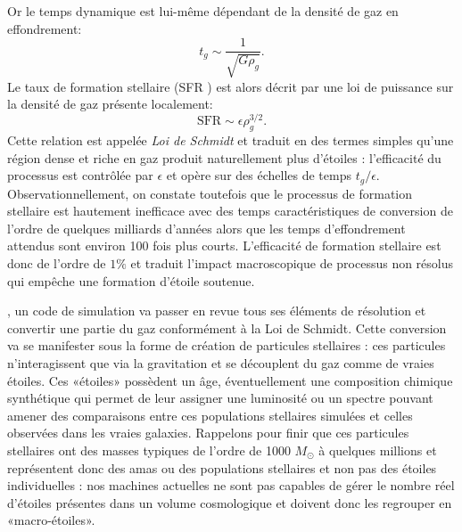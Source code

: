 Or le temps dynamique est lui-même dépendant de la densité de gaz en effondrement:
\begin{equation}
t_g\sim\frac{1}{\sqrt{G\rho_g}}.
\end{equation}
Le taux de formation stellaire (SFR ) est alors décrit par une loi de puissance sur la densité de gaz présente localement:
\begin{equation}
\mathrm{SFR}\sim \epsilon \rho_g^{3/2}.
\label{e:schmidt}
\end{equation}
Cette relation est appelée \textit{Loi de Schmidt} et traduit en des termes simples qu'une région dense et riche en gaz produit naturellement plus d'étoiles : l'efficacité du processus est contrôlée par $\epsilon$ et opère sur des échelles de temps $t_g/\epsilon$. Observationnellement, on constate toutefois que le processus de formation stellaire est hautement inefficace avec des temps caractéristiques de conversion de l'ordre de quelques milliards d'années alors que les temps d'effondrement attendus sont environ 100 fois plus courts. L'efficacité de formation stellaire est donc de l'ordre de $1\%$ et traduit l'impact macroscopique de processus non résolus qui empêche une formation d'étoile soutenue.

, un code de simulation va passer en revue tous ses éléments de résolution et convertir une partie du gaz conformément à la Loi de Schmidt. Cette conversion va se manifester sous la forme de création de particules stellaires : ces particules n'interagissent que via la gravitation et se découplent du gaz comme de vraies étoiles. Ces «étoiles» possèdent un âge, éventuellement une composition chimique synthétique qui permet de leur assigner une luminosité ou un spectre pouvant amener des comparaisons entre ces populations stellaires simulées et celles observées dans les vraies galaxies. Rappelons pour finir que ces particules stellaires ont des masses typiques de l'ordre de 1000 $M_\odot$ à quelques millions et représentent donc des amas ou des populations stellaires et non pas des étoiles individuelles : nos machines actuelles ne sont pas capables de gérer le nombre réel d'étoiles présentes dans un volume cosmologique et doivent donc les regrouper en «macro-étoiles».

